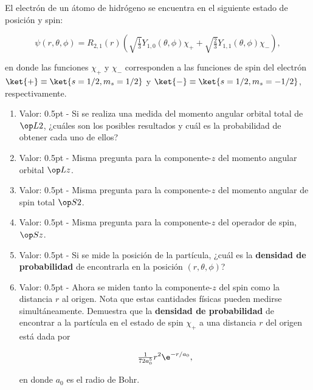 \documentclass[./../main.tex]{subfiles}
\begin{document}
    \begin{exercise}
        El electrón de un átomo de hidrógeno se encuentra en el siguiente estado de posición y spin:

        \begin{equation*}
            \psi(r, \theta, \phi) = R_{2,1}(r) \left(\sqrt{\tfrac{1}{3}}Y_{1,0}(\theta, \phi)\chi_{+} + \sqrt{\tfrac{2}{3}}Y_{1,1}(\theta, \phi)\chi_{-}\right),
        \end{equation*}

        en donde las funciones \(\chi_{+}\) y \(\chi_{-}\) corresponden a las funciones de spin del electrón \(\ket{+} \equiv \ket{s = 1/2, m_{s} = 1/2}\) y \(\ket{-} \equiv \ket{s = 1/2, m_{s} = -1/2}\), respectivamente.

        \begin{enumerate}
            \item Valor: 0.5pt - Si se realiza una medida del momento angular orbital total de \(\observable{L}[][2]\), ¿cuáles son los posibles resultados y cuál es la probabilidad de obtener cada uno de ellos?
            \item Valor: 0.5pt - Misma pregunta para la componente-\(z\) del momento angular orbital \(\observable{L}[z]\).
            \item Valor: 0.5pt - Misma pregunta para la componente-\(z\) del momento angular de spin total \(\observable{S}[][2]\).
            \item Valor: 0.5pt - Misma pregunta para la componente-\(z\) del operador de spin, \(\observable{S}[z]\).
            \item Valor: 0.5pt - Si se mide la posición de la partícula, ¿cuál es la \textbf{densidad de probabilidad} de encontrarla en la posición \((r, \theta, \phi)\)?
            \item Valor: 0.5pt - Ahora se miden tanto la componente-\(z\) del spin como la distancia \(r\) al origen. Nota que estas cantidades físicas pueden medirse simultáneamente. Demuestra que la \textbf{densidad de probabilidad} de encontrar a la partícula en el estado de spin \(\chi_{+}\) a una distancia \(r\) del origen está dada por
            
            \begin{equation*}
                \tfrac{1}{72a_{0}^{5}}r^{2}\e^{-r/a_{0}},
            \end{equation*}

            en donde \(a_{0}\) es el radio de Bohr.


\end{enumerate}
\end{exercise}
\end{document}
